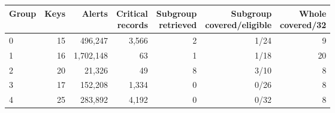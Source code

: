 \begin{tabular}{lrrrrrr}
\toprule
Group & Keys & Alerts & \shortstack{Critical\\records} & \shortstack{Subgroup\\retrieved} & \shortstack{Subgroup\\covered/eligible} & \shortstack{Whole\\covered/32} \\
\midrule
0 & 15 & 496,247 & 3,566 & 2 & 1/24 & 9 \\
1 & 16 & 1,702,148 & 63 & 1 & 1/18 & 20 \\
2 & 20 & 21,326 & 49 & 8 & 3/10 & 8 \\
3 & 17 & 152,208 & 1,334 & 0 & 0/26 & 8 \\
4 & 25 & 283,892 & 4,192 & 0 & 0/32 & 8 \\
\bottomrule
\end{tabular}
